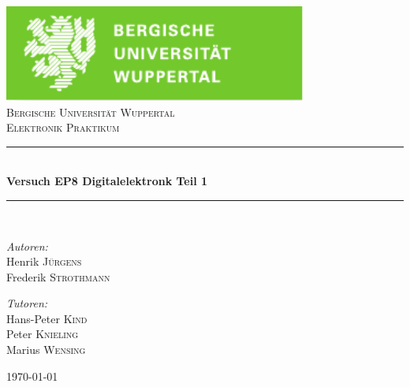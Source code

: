 \documentclass[12pt,a4paper]{article}
\begin{document}


\begin{titlepage}

\begin{center}
\includegraphics[width=0.75\textwidth]{logo.pdf}\\[1cm]    	%

\textsc{\LARGE Bergische Universität Wuppertal}\\[1.5cm]	%

\textsc{\Large Elektronik Praktikum}\\[0.5cm]				%


\newcommand{\HRule}{\rule{\linewidth}{0.5mm}}
\HRule \\[0.4cm]
{ \huge \bfseries Versuch EP8 Digitalelektronk Teil 1}\\[0.4cm]				%

\HRule \\[1.5cm]

\begin{minipage}{0.4\textwidth}
\begin{flushleft} \large
\emph{Autoren:}\\
Henrik \textsc{Jürgens} \\
Frederik \textsc{Strothmann}
\end{flushleft}
\end{minipage}
\hfill
\begin{minipage}{0.4\textwidth}
\begin{flushright} \large
\emph{Tutoren:} \\
Hans-Peter \textsc{Kind} \\
Peter \textsc{Knieling} \\
Marius \textsc{Wensing}
\end{flushright}
\end{minipage}

\vfill

{\large \today}

\end{center}

\end{titlepage}
\end{document}

